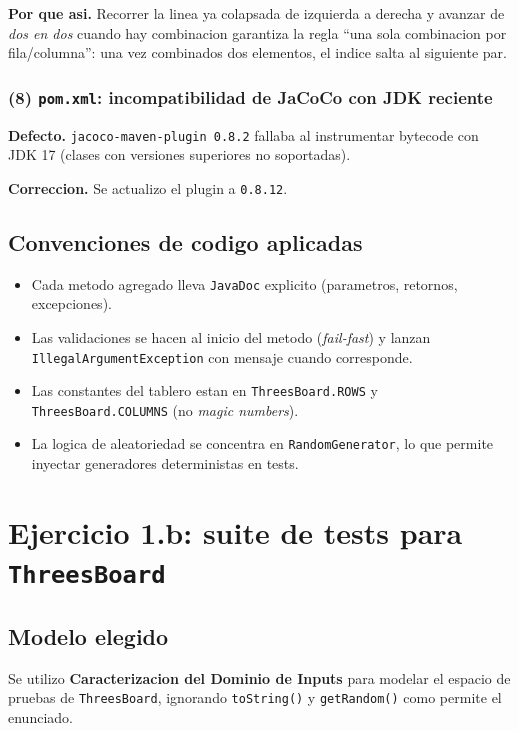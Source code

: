 \documentclass[12pt,a4paper]{article}
\begin{document}
\textbf{Por que asi.} Recorrer la linea ya colapsada de izquierda a derecha y avanzar de
\emph{dos en dos} cuando hay combinacion garantiza la regla ``una sola combinacion por
fila/columna'': una vez combinados dos elementos, el indice salta al siguiente par.

\subsubsection*{(8) \texttt{pom.xml}: incompatibilidad de JaCoCo con JDK reciente}

\textbf{Defecto.} \texttt{jacoco-maven-plugin 0.8.2} fallaba al instrumentar bytecode con
JDK 17 (clases con versiones superiores no soportadas).

\textbf{Correccion.} Se actualizo el plugin a \texttt{0.8.12}.

\subsection{Convenciones de codigo aplicadas}

\begin{itemize}
  \item Cada metodo agregado lleva \texttt{JavaDoc} explicito (parametros, retornos,
  excepciones).
  \item Las validaciones se hacen al inicio del metodo (\emph{fail-fast}) y lanzan
  \texttt{IllegalArgumentException} con mensaje cuando corresponde.
  \item Las constantes del tablero estan en \texttt{ThreesBoard.ROWS} y
  \texttt{ThreesBoard.COLUMNS} (no \emph{magic numbers}).
  \item La logica de aleatoriedad se concentra en \texttt{RandomGenerator}, lo que permite
  inyectar generadores deterministas en tests.
\end{itemize}

\section{Ejercicio 1.b: suite de tests para \texttt{ThreesBoard}}

\subsection{Modelo elegido}

Se utilizo \textbf{Caracterizacion del Dominio de Inputs} para modelar el espacio de pruebas
de \texttt{ThreesBoard}, ignorando \texttt{toString()} y \texttt{getRandom()} como permite el
enunciado.
\end{document}
